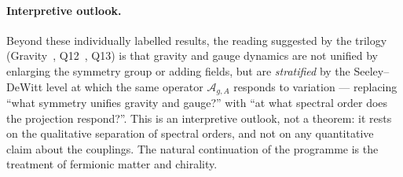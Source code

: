 \documentclass[12pt,a4paper]{article}
\theoremstyle{remark}
\begin{document}
    \paragraph{Interpretive outlook.}
      Beyond these individually labelled results, the reading suggested by the trilogy
      (Gravity~\cite{Beau2026h}, Q12~\cite{Beau2026q12}, Q13) is that gravity and gauge dynamics
      are not unified by enlarging the symmetry group or adding fields, but are \emph{stratified}
      by the Seeley--DeWitt level at which the same operator $\mathcal{A}_{g,A}$ responds to
      variation --- replacing ``what symmetry unifies gravity and gauge?'' with ``at what
      spectral order does the projection respond?''.
      This is an interpretive outlook, not a theorem: it rests on the qualitative separation of
      spectral orders, and not on any quantitative claim about the couplings.
      The natural continuation of the programme is the treatment of fermionic matter and
      chirality.

      \clearpage
      
      
\end{document}
